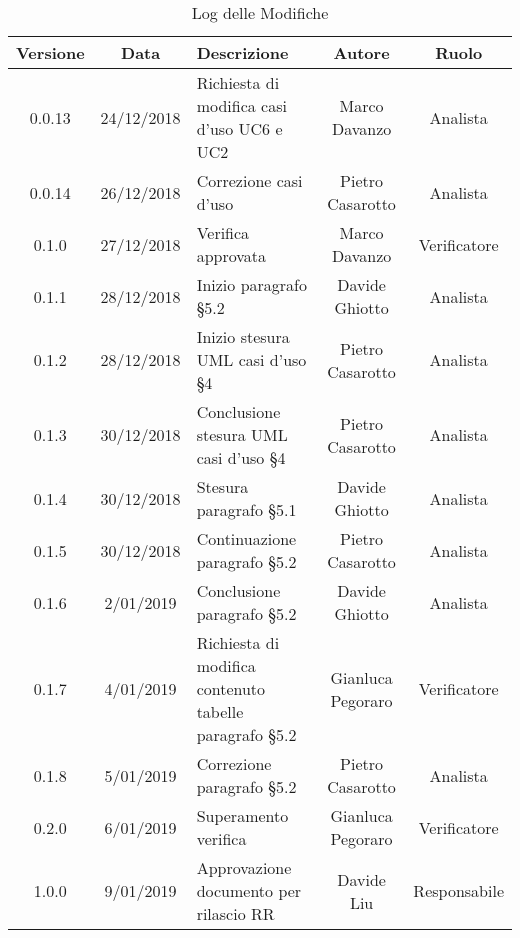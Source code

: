 \begin{table}[h!] %
            \centering
            \renewcommand{\arraystretch}{2}
            \begin{tabular}{|c|c|p{5cm}|c|c|} %
                \rowcolor{orange!50} %
        		\hline
        		\textbf{Versione} & \textbf{Data} & \textbf{Descrizione} & \textbf{Autore} & \textbf{Ruolo} \\
                \hline
                0.0.13 & 24/12/2018 & Richiesta di modifica casi d’uso UC6 e UC2 & Marco Davanzo & Analista \\
                \hline
                0.0.14 & 26/12/2018 & Correzione casi d’uso & Pietro Casarotto & Analista \\
                \hline
                0.1.0 & 27/12/2018 & Verifica approvata & Marco Davanzo & Verificatore \\
                \hline
                0.1.1 & 28/12/2018 & Inizio paragrafo §5.2 & Davide Ghiotto & Analista \\
                \hline
                0.1.2 & 28/12/2018 & Inizio stesura UML casi d'uso §4 & Pietro Casarotto & Analista \\
                \hline
                0.1.3 & 30/12/2018 & Conclusione stesura UML casi d’uso §4 & Pietro Casarotto & Analista \\
                \hline
                0.1.4 & 30/12/2018 & Stesura paragrafo §5.1 & Davide Ghiotto& Analista \\
                \hline
                0.1.5 & 30/12/2018 & Continuazione paragrafo §5.2 & Pietro Casarotto & Analista \\
                \hline
                0.1.6 & 2/01/2019 & Conclusione paragrafo §5.2 & Davide Ghiotto & Analista \\
                \hline
                0.1.7 & 4/01/2019 & Richiesta di modifica contenuto tabelle paragrafo §5.2 & Gianluca Pegoraro & Verificatore \\
                \hline
                0.1.8 & 5/01/2019 & Correzione paragrafo §5.2 & Pietro Casarotto & Analista \\
                \hline
                0.2.0 & 6/01/2019 & Superamento verifica & Gianluca Pegoraro & Verificatore \\
                \hline
                1.0.0 & 9/01/2019 & Approvazione documento per rilascio RR & Davide Liu & Responsabile \\
                \hline
                
        \end{tabular}
        \caption{Log delle Modifiche} %
        \label{tab:Log delle modifiche2}
\end{table}


